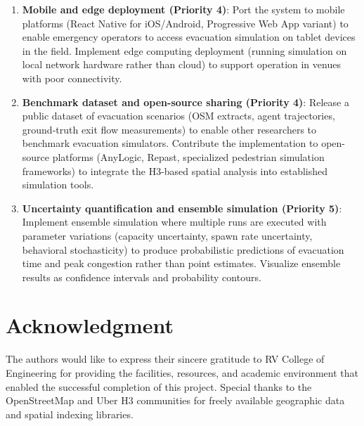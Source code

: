 \documentclass[conference]{IEEEtran}
\begin{document}
\begin{enumerate}
\item \textbf{Mobile and edge deployment (Priority 4)}: Port the system to mobile platforms (React Native for iOS/Android, Progressive Web App variant) to enable emergency operators to access evacuation simulation on tablet devices in the field. Implement edge computing deployment (running simulation on local network hardware rather than cloud) to support operation in venues with poor connectivity.

\item \textbf{Benchmark dataset and open-source sharing (Priority 4)}: Release a public dataset of evacuation scenarios (OSM extracts, agent trajectories, ground-truth exit flow measurements) to enable other researchers to benchmark evacuation simulators. Contribute the implementation to open-source platforms (AnyLogic, Repast, specialized pedestrian simulation frameworks) to integrate the H3-based spatial analysis into established simulation tools.

\item \textbf{Uncertainty quantification and ensemble simulation (Priority 5)}: Implement ensemble simulation where multiple runs are executed with parameter variations (capacity uncertainty, spawn rate uncertainty, behavioral stochasticity) to produce probabilistic predictions of evacuation time and peak congestion rather than point estimates. Visualize ensemble results as confidence intervals and probability contours.
\end{enumerate}

\section*{Acknowledgment}

The authors would like to express their sincere gratitude to RV College of Engineering for providing the facilities, resources, and academic environment that enabled the successful completion of this project. Special thanks to the OpenStreetMap and Uber H3 communities for freely available geographic data and spatial indexing libraries.
\end{document}
